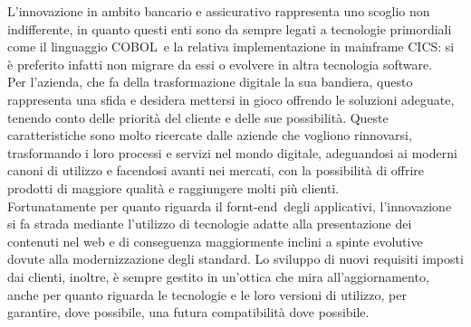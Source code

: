 	L'innovazione in ambito bancario e assicurativo rappresenta uno scoglio non indifferente, in quanto questi enti sono da sempre legati a tecnologie primordiali come il linguaggio COBOL\glossario\ e la relativa implementazione in mainframe CICS\glossario : si è preferito infatti non migrare da essi o evolvere in altra tecnologia software.\\
	
	Per l'azienda, che fa della trasformazione digitale la sua bandiera, questo rappresenta una sfida e desidera mettersi in gioco offrendo le soluzioni adeguate, tenendo conto delle priorità del cliente e delle sue possibilità. Queste caratteristiche sono molto ricercate dalle aziende che vogliono rinnovarsi, trasformando i loro processi e servizi nel mondo digitale, adeguandosi ai moderni canoni di utilizzo e facendosi avanti nei mercati, con la possibilità di offrire prodotti di maggiore qualità e raggiungere molti più clienti.\\
	
	Fortunatamente per quanto riguarda il fornt-end\glossario\ degli applicativi, l'innovazione si fa strada mediante l'utilizzo di tecnologie adatte alla presentazione dei contenuti	nel web e di conseguenza maggiormente inclini a spinte evolutive dovute alla modernizzazione degli standard. Lo sviluppo di nuovi requisiti imposti dai clienti, inoltre, è sempre gestito in un'ottica che mira all'aggiornamento, anche per quanto riguarda le tecnologie e le loro versioni di utilizzo, per garantire, dove possibile, una futura compatibilità dove possibile.